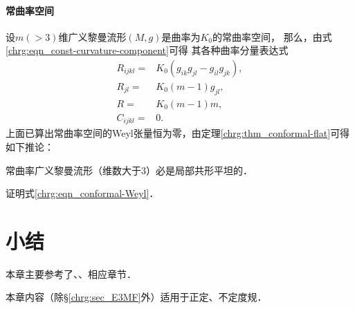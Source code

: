 \paragraph{常曲率空间}
设$m(>3)$维广义黎曼流形$(M,g)$是曲率为$K_0$的常曲率空间，
那么，由式\eqref{chrg:eqn_const-curvature-component}可得
其各种曲率分量表达式
\begin{align}
    R_{ijkl}=&  K_0 ( g_{ik}g_{jl}- g_{il}g_{jk}  ), \\
    R_{jl}=&  K_0 ( m - 1  ) g_{jl}, \label{chrg:eqn_CR-ricci} \\
    R=& K_0 ( m - 1  ) m , \\
    C_{ijkl}=& 0 .
\end{align}
上面已算出常曲率空间的Weyl张量恒为零，由定理\ref{chrg:thm_conformal-flat}可得如下推论：
\begin{corollary}\label{chrg:thm_conformal-flat-const-curvature}
    常曲率广义黎曼流形（维数大于3）必是局部共形平坦的．
\end{corollary}




\begin{exercise}
	证明式\eqref{chrg:eqn_conformal-Weyl}．
\end{exercise}


\section*{小结}
本章主要参考了\parencite{oneill1983}、\parencite{cc2001-zh}、\parencite{chen-li-2023-2ed-v1}相应章节．

本章内容（除\S\ref{chrg:sec_E3MF}外）适用于正定、不定度规．


\printbibliography[heading=subbibliography,title=第\ref{chrg}章参考文献]

\endinput

